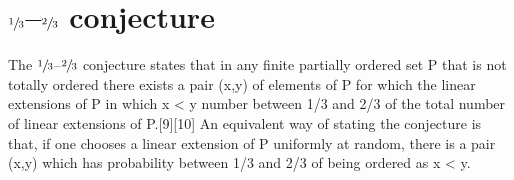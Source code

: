 \section{$\sfrac{1}{3}$--$\sfrac{2}{3}$ conjecture}

The $\sfrac{1}{3}$--$\sfrac{2}{3}$ conjecture states that in any finite partially ordered set P that is not totally ordered there exists a pair (x,y) of elements of P for which the linear extensions of P in which x < y number between 1/3 and 2/3 of the total number of linear extensions of P.[9][10] An equivalent way of stating the conjecture is that, if one chooses a linear extension of P uniformly at random, there is a pair (x,y) which has probability between 1/3 and 2/3 of being ordered as x < y.